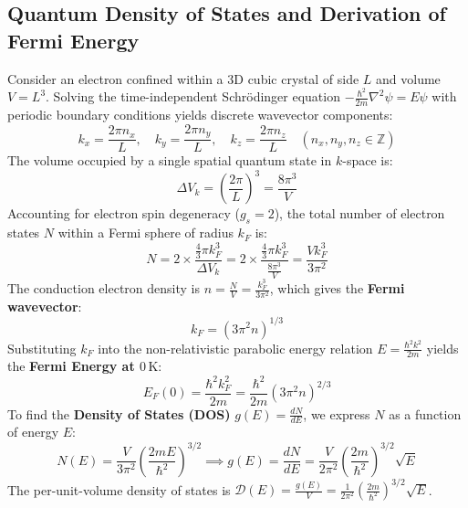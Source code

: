 \subsection{Quantum Density of States and Derivation of Fermi Energy}
\begin{derivationbox}
Consider an electron confined within a 3D cubic crystal of side $L$ and volume $V = L^3$. Solving the time-independent Schr\"{o}dinger equation $-\frac{\hbar^2}{2m}\nabla^2 \psi = E\psi$ with periodic boundary conditions yields discrete wavevector components:
\begin{equation}
    k_x = \frac{2\pi n_x}{L}, \quad k_y = \frac{2\pi n_y}{L}, \quad k_z = \frac{2\pi n_z}{L} \quad (n_x, n_y, n_z \in \mathbb{Z})
\end{equation}
The volume occupied by a single spatial quantum state in $k$-space is:
\begin{equation}
    \Delta V_k = \left(\frac{2\pi}{L}\right)^3 = \frac{8\pi^3}{V}
\end{equation}
Accounting for electron spin degeneracy ($g_s = 2$), the total number of electron states $N$ within a Fermi sphere of radius $k_F$ is:
\begin{equation}
    N = 2 \times \frac{\frac{4}{3}\pi k_F^3}{\Delta V_k} = 2 \times \frac{\frac{4}{3}\pi k_F^3}{\frac{8\pi^3}{V}} = \frac{V k_F^3}{3\pi^2}
\end{equation}
The conduction electron density is $n = \frac{N}{V} = \frac{k_F^3}{3\pi^2}$, which gives the \textbf{Fermi wavevector}:
\begin{equation}
    k_F = \left(3\pi^2 n\right)^{1/3}
\end{equation}
Substituting $k_F$ into the non-relativistic parabolic energy relation $E = \frac{\hbar^2 k^2}{2m}$ yields the \textbf{Fermi Energy at $0\,\text{K}$}:
\begin{equation}
    E_F(0) = \frac{\hbar^2 k_F^2}{2m} = \frac{\hbar^2}{2m}\left(3\pi^2 n\right)^{2/3}
\end{equation}
To find the \textbf{Density of States (DOS)} $g(E) = \frac{dN}{dE}$, we express $N$ as a function of energy $E$:
\begin{equation}
    N(E) = \frac{V}{3\pi^2}\left(\frac{2mE}{\hbar^2}\right)^{3/2} \implies g(E) = \frac{dN}{dE} = \frac{V}{2\pi^2}\left(\frac{2m}{\hbar^2}\right)^{3/2} \sqrt{E}
\end{equation}
The per-unit-volume density of states is $\mathcal{D}(E) = \frac{g(E)}{V} = \frac{1}{2\pi^2}\left(\frac{2m}{\hbar^2}\right)^{3/2}\sqrt{E}$.
\end{derivationbox}

